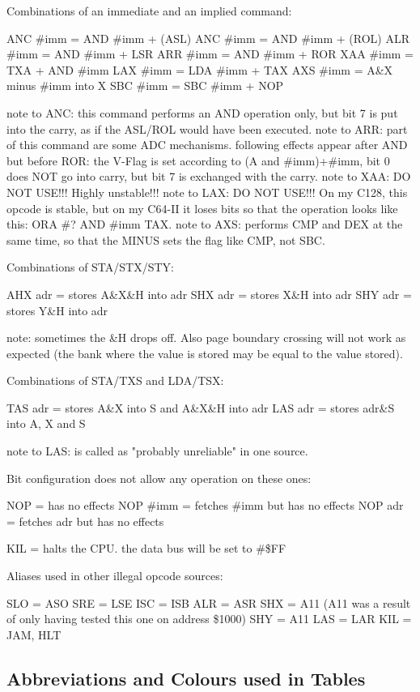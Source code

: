 \begin{code}
Combinations of an immediate and an implied command:

ANC \#{imm} = AND \#{imm} + (ASL)
ANC \#{imm} = AND \#{imm} + (ROL)
ALR \#{imm} = AND \#{imm} + LSR
ARR \#{imm} = AND \#{imm} + ROR
XAA \#{imm} = TXA + AND \#{imm}
LAX \#{imm} = LDA \#{imm} + TAX
AXS \#{imm} = A\&X minus #{imm} into X
SBC \#{imm} = SBC \#{imm} + NOP

note to ANC: this command performs an AND operation only, but bit 7 is put into the carry, as if the ASL/ROL would have been executed.
note to ARR: part of this command are some ADC mechanisms. following effects appear after AND but before ROR: the V-Flag is set according to (A and \#{imm})+\#{imm}, bit 0 does NOT go into carry, but bit 7 is exchanged with the carry.
note to XAA: DO NOT USE!!! Highly unstable!!!
note to LAX: DO NOT USE!!! On my C128, this opcode is stable, but on my C64-II it loses bits so that the operation looks like this: ORA \#? AND \#{imm} TAX.
note to AXS: performs CMP and DEX at the same time, so that the MINUS sets the flag like CMP, not SBC.


Combinations of STA/STX/STY:

AHX {adr} = stores A\&X\&H into {adr}
SHX {adr} = stores X\&H into {adr}
SHY {adr} = stores Y\&H into {adr}

note: sometimes the \&H drops off. Also page boundary crossing will not work as expected (the bank where the value is stored may be equal to the value stored).


Combinations of STA/TXS and LDA/TSX:

TAS {adr} = stores A\&X into S and A\&X\&H into {adr}
LAS {adr} = stores {adr}\&S into A, X and S

note to LAS: is called as "probably unreliable" in one source.


Bit configuration does not allow any operation on these ones:

NOP = has no effects
NOP #{imm} = fetches #{imm} but has no effects
NOP {adr} = fetches {adr} but has no effects


KIL = halts the CPU. the data bus will be set to \#\$FF


Aliases used in other illegal opcode sources:

SLO = ASO
SRE = LSE
ISC = ISB
ALR = ASR
SHX = A11 (A11 was a result of only having tested this one on address \$1000)
SHY = A11
LAS = LAR
KIL = JAM, HLT

\end{code}
\fi

\subsection{Abbreviations and Colours used in Tables}
